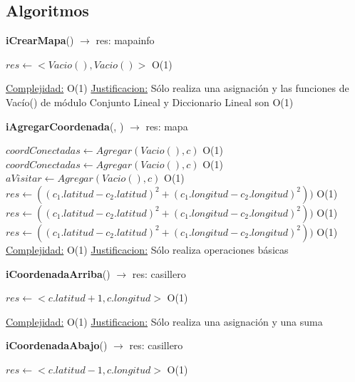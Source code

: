\subsection{Algoritmos}
\begin{Algoritmos}

\begin{algorithm}[H]{\textbf{iCrearMapa}() $\to$ res: mapainfo}
	\begin{algorithmic}[1]
		\State $res \gets <Vacio(), Vacio()>$ \Comment O(1)

		\medskip
		\Statex \underline{Complejidad:} O(1)
			\Statex \underline{Justificacion:} Sólo realiza una asignación y las funciones de Vac\'io() de m\'odulo Conjunto Lineal y Diccionario Lineal son O(1)
	\end{algorithmic}
\end{algorithm}

\begin{algorithm}[H]{\textbf{iAgregarCoordenada}(, ) $\to$ res: mapa}
	\begin{algorithmic}[1]
		\State $coordConectadas \gets Agregar(Vacio(), c)$ \Comment O(1)
		\State $coordConectadas \gets Agregar(Vacio(), c)$ \Comment O(1)
		\State $aVisitar \gets Agregar(Vacio(), c)$ \Comment O(1)
		\State $res \gets ((c_1.latitud - c_2.latitud)^{2} + (c_1.longitud  - c_2.longitud)^{2}))$ \Comment O(1)
		\State $res \gets ((c_1.latitud - c_2.latitud)^{2} + (c_1.longitud  - c_2.longitud)^{2}))$ \Comment O(1)
		\State $res \gets ((c_1.latitud - c_2.latitud)^{2} + (c_1.longitud  - c_2.longitud)^{2}))$ \Comment O(1)
				\medskip
		\Statex \underline{Complejidad:} O(1)
			\Statex \underline{Justificacion:} Sólo realiza operaciones básicas
	\end{algorithmic}
\end{algorithm}

\begin{algorithm}[H]{\textbf{iCoordenadaArriba}() $\to$ res: casillero}
	\begin{algorithmic}[1]
		\State $res \gets <c.latitud +1, c.longitud>$ \Comment O(1)

		\medskip
		\Statex \underline{Complejidad:} O(1)
			\Statex \underline{Justificacion:} Sólo realiza una asignación y una suma
	\end{algorithmic}
\end{algorithm}

\begin{algorithm}[H]{\textbf{iCoordenadaAbajo}() $\to$ res: casillero}
	\begin{algorithmic}[1]
		\State $res \gets <c.latitud -1, c.longitud>$ \Comment O(1)


\end{algorithmic}
\end{algorithm}
\end{Algoritmos}
